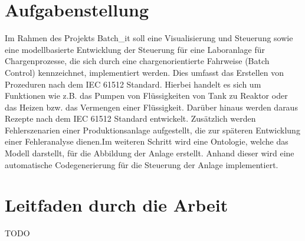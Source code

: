 
\section{Aufgabenstellung}
 Im Rahmen des Projekts Batch\_it soll eine Visualisierung und Steuerung sowie eine modellbasierte Entwicklung der Steuerung für eine Laboranlage für Chargenprozesse, die sich durch eine chargenorientierte Fahrweise (Batch Control) kennzeichnet,  implementiert werden. Dies umfasst das Erstellen von Prozeduren nach dem IEC 61512 Standard. Hierbei handelt es sich um Funktionen wie z.B. das Pumpen von Flüssigkeiten von Tank zu Reaktor oder das Heizen bzw. das Vermengen einer Flüssigkeit. Darüber hinaus werden daraus Rezepte nach dem IEC 61512 Standard entwickelt. Zusätzlich werden Fehlerszenarien einer Produktionsanlage aufgestellt, die zur späteren Entwicklung einer Fehleranalyse dienen.Im weiteren Schritt wird eine Ontologie, welche das Modell darstellt, für die Abbildung der Anlage erstellt. Anhand dieser wird eine automatische Codegenerierung für die Steuerung der Anlage implementiert.

\section{Leitfaden durch die Arbeit}
TODO
